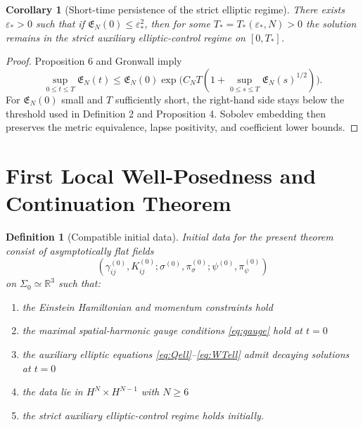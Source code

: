 \documentclass[11pt]{article}
\newtheorem{definition}{Definition}
\newtheorem{corollary}{Corollary}
\begin{document}
\begin{corollary}[Short-time persistence of the strict elliptic regime]
There exists \(\varepsilon_*>0\) such that if \(\mathfrak E_N(0)\le \varepsilon_*^2\), then for some \(T_*=T_*(\varepsilon_*,N)>0\) the solution remains in the strict auxiliary elliptic-control regime on \([0,T_*]\).
\end{corollary}

\begin{proof}
Proposition 6 and Gronwall imply
\[
\sup_{0\le t\le T}\mathfrak E_N(t)
\le
\mathfrak E_N(0)\exp\!\bigl(C_NT(1+\sup_{0\le s\le T}\mathfrak E_N(s)^{1/2})\bigr).
\]
For \(\mathfrak E_N(0)\) small and \(T\) sufficiently short, the right-hand side stays below the threshold used in Definition 2 and Proposition 4. Sobolev embedding then preserves the metric equivalence, lapse positivity, and coefficient lower bounds.
\end{proof}

\section{First Local Well-Posedness and Continuation Theorem}

\begin{definition}[Compatible initial data]
Initial data for the present theorem consist of asymptotically flat fields
\begin{equation}
(\gamma_{ij}^{(0)},K_{ij}^{(0)};\sigma^{(0)},\pi_\sigma^{(0)};\psi^{(0)},\pi_\psi^{(0)})
\label{eq:initdata}
\end{equation}
on \(\Sigma_0\simeq\mathbb R^3\) such that:
\begin{enumerate}
    \item the Einstein Hamiltonian and momentum constraints hold
    \item the maximal spatial-harmonic gauge conditions \eqref{eq:gauge} hold at \(t=0\)
    \item the auxiliary elliptic equations \eqref{eq:Qell}--\eqref{eq:WTell} admit decaying solutions at \(t=0\)
    \item the data lie in \(H^N\times H^{N-1}\) with \(N\ge 6\)
    \item the strict auxiliary elliptic-control regime holds initially.
\end{enumerate}
\end{definition}
\end{document}
